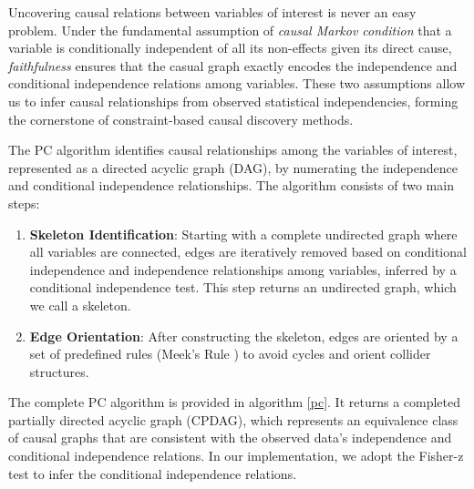 Uncovering causal relations between variables of interest is never an easy problem. Under the fundamental assumption of \textit{causal Markov condition} that a variable is conditionally independent of all its non-effects given its direct cause, \textit{faithfulness} ensures that the casual graph exactly encodes the independence and conditional independence relations among variables. These two assumptions allow us to infer causal relationships from observed statistical independencies, forming the cornerstone of constraint-based causal discovery methods. 

The PC algorithm identifies causal relationships among the variables of interest, represented as a directed acyclic graph (DAG), by numerating the independence and conditional independence relationships. The algorithm consists of two main steps: 
\begin{enumerate}
    \item \textbf{Skeleton Identification}: Starting with a complete undirected graph where all variables are connected, edges are iteratively removed based on conditional independence and independence relationships among variables, inferred by a conditional independence test. This step returns an undirected graph, which we call a skeleton. 
    \item \textbf{Edge Orientation}: After constructing the skeleton, edges are oriented by a set of predefined rules (Meek's Rule \cite{meek1997graphical}) to avoid cycles and orient collider structures.
\end{enumerate}

The complete PC algorithm is provided in algorithm \ref{pc}. It returns a  completed partially directed acyclic graph (CPDAG), which represents an equivalence class of causal graphs that are consistent with the observed data’s independence and conditional independence relations. In our implementation, we adopt the  Fisher-z test \cite{fisher_probable_1921} to infer the conditional independence relations.

